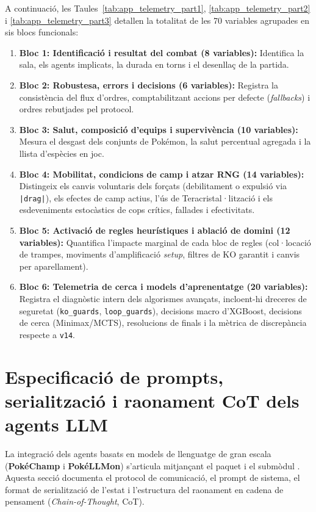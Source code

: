 A continuació, les Taules~\ref{tab:app_telemetry_part1}, \ref{tab:app_telemetry_part2} i \ref{tab:app_telemetry_part3} detallen la totalitat de les 70 variables agrupades en sis blocs funcionals:
\begin{enumerate}
    \item \textbf{Bloc 1: Identificació i resultat del combat (8 variables):} Identifica la sala, els agents implicats, la durada en torns i el desenllaç de la partida.
    \item \textbf{Bloc 2: Robustesa, errors i decisions (6 variables):} Registra la consistència del flux d'ordres, comptabilitzant accions per defecte (\emph{fallbacks}) i ordres rebutjades pel protocol.
    \item \textbf{Bloc 3: Salut, composició d'equips i supervivència (10 variables):} Mesura el desgast dels conjunts de Pokémon, la salut percentual agregada i la llista d'espècies en joc.
    \item \textbf{Bloc 4: Mobilitat, condicions de camp i atzar RNG (14 variables):} Distingeix els canvis voluntaris dels forçats (debilitament o expulsió via \texttt{|drag|}), els efectes de camp actius, l'ús de Teracristal·lització i els esdeveniments estocàstics de cops crítics, fallades i efectivitats.
    \item \textbf{Bloc 5: Activació de regles heurístiques i ablació de domini (12 variables):} Quantifica l'impacte marginal de cada bloc de regles (col·locació de trampes, moviments d'amplificació \emph{setup}, filtres de KO garantit i canvis per aparellament).
    \item \textbf{Bloc 6: Telemetria de cerca i models d'aprenentatge (20 variables):} Registra el diagnòstic intern dels algorismes avançats, incloent-hi dreceres de seguretat (\texttt{ko\_guards}, \texttt{loop\_guards}), decisions macro d'XGBoost, decisions de cerca (Minimax/MCTS), resolucions de finals i la mètrica de discrepància respecte a \texttt{v14}.
\end{enumerate}



\section{Especificació de prompts, serialització i raonament CoT dels agents LLM}
\label{sec:app_llm_prompts}

La integració dels agents basats en models de llenguatge de gran escala (\textbf{PokéChamp} i \textbf{PokéLLMon}) s'articula mitjançant el paquet  i el submòdul . Aquesta secció documenta el protocol de comunicació, el prompt de sistema, el format de serialització de l'estat i l'estructura del raonament en cadena de pensament (\textit{Chain-of-Thought}, CoT).

